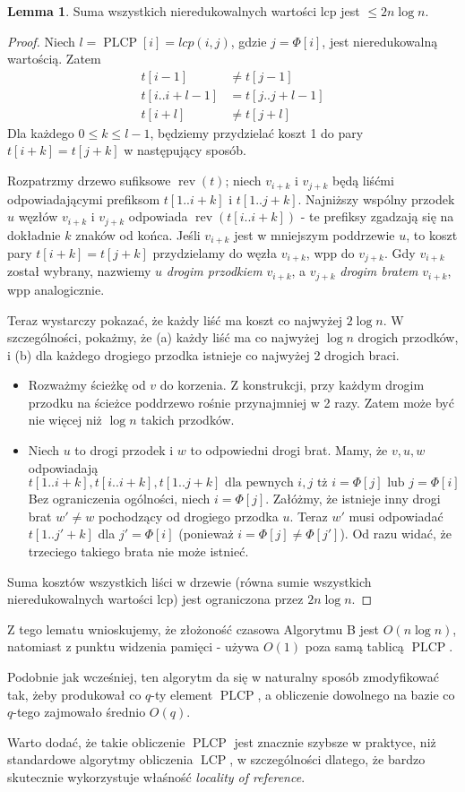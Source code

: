 \documentclass[a4paper,12pt]{article}
\theoremstyle{definition}
\newtheorem{lemma}{Lemma}[section]
\DeclareMathOperator{\LCP}{LCP}
\DeclareMathOperator{\PLCP}{PLCP}
\DeclareMathOperator{\rev}{rev}
\begin{document}
\begin{lemma}
Suma wszystkich nieredukowalnych wartości lcp jest $\le 2n\log n$.
\begin{proof}
Niech $l = \PLCP[i] = lcp(i, j)$, gdzie $j = \Phi[i]$, jest nieredukowalną wartością. Zatem
\begin{align*}
t[i - 1] &\neq t[j - 1] \\
t[i..i+l-1] &= t[j..j+l-1] \\
t[i + l] &\neq t[j + l]
\end{align*}
Dla każdego $0 \le k \le l-1$, będziemy przydzielać koszt 1 do pary $t[i + k] = t[j + k]$ w następujący sposób.
\par
Rozpatrzmy drzewo sufiksowe $\rev(t)$; niech $v_{i+k}$ i $v_{j+k}$ będą liśćmi odpowiadającymi prefiksom $t[1..i+k]$ i $t[1..j+k]$. Najniższy wspólny przodek $u$ węzłów $v_{i+k}$ i $v_{j+k}$ odpowiada $\rev(t[i..i+k])$ - te prefiksy zgadzają się na dokładnie $k$ znaków od końca. Jeśli $v_{i+k}$ jest w mniejszym poddrzewie $u$, to koszt pary $t[i + k] = t[j + k]$ przydzielamy do węzła $v_{i+k}$, wpp do $v_{j+k}$. Gdy $v_{i+k}$ został wybrany, nazwiemy $u$ \textit{drogim przodkiem} $v_{i+k}$, a $v_{j+k}$ \textit{drogim bratem} $v_{i+k}$, wpp analogicznie.
\par
Teraz wystarczy pokazać, że każdy liść ma koszt co najwyżej $2\log n$. W szczególności, pokażmy, że (a) każdy liść ma co najwyżej $\log n$ drogich przodków, i (b) dla każdego drogiego przodka istnieje co najwyżej 2 drogich braci.
\begin{itemize}
\item Rozważmy ścieżkę od $v$ do korzenia. Z konstrukcji, przy każdym drogim przodku na ścieżce poddrzewo rośnie przynajmniej w 2 razy. Zatem może być nie więcej niż $\log n$ takich przodków.
\item Niech $u$ to drogi przodek i $w$ to odpowiedni drogi brat. Mamy, że $v,u,w$ odpowiadają
\[
t[1..i+k], t[i..i+k],t[1..j+k] \text{ dla pewnych } i, j \text{ tż } i = \Phi[j] \text{ lub } j = \Phi[i]
\]
Bez ograniczenia ogólności, niech $i = \Phi[j]$. Załóżmy, że istnieje inny drogi brat $w' \neq w$ pochodzący od drogiego przodka $u$. Teraz $w'$ musi odpowiadać $t[1..j'+k]$ dla $j' = \Phi[i]$ (ponieważ $i = \Phi[j] \neq \Phi[j']$). Od razu widać, że trzeciego takiego brata nie może istnieć.
\end{itemize}
Suma kosztów wszystkich liści w drzewie (równa sumie wszystkich nieredukowalnych wartości lcp) jest ograniczona przez $2n\log n$.
\end{proof}
\end{lemma}

Z tego lematu wnioskujemy, że złożoność czasowa Algorytmu B jest $O(n\log n)$, natomiast z punktu widzenia pamięci - używa $O(1)$ poza samą tablicą $\PLCP$.
\par
Podobnie jak wcześniej, ten algorytm da się w naturalny sposób zmodyfikować tak, żeby produkował co $q$-ty element $\PLCP$, a obliczenie dowolnego na bazie co $q$-tego zajmowało średnio $O(q)$.
\par
Warto dodać, że takie obliczenie $\PLCP$ jest znacznie szybsze w praktyce, niż standardowe algorytmy obliczenia $\LCP$, w szczególności dlatego, że bardzo skutecznie wykorzystuje właśność \textit{locality of reference}.
\end{document}
